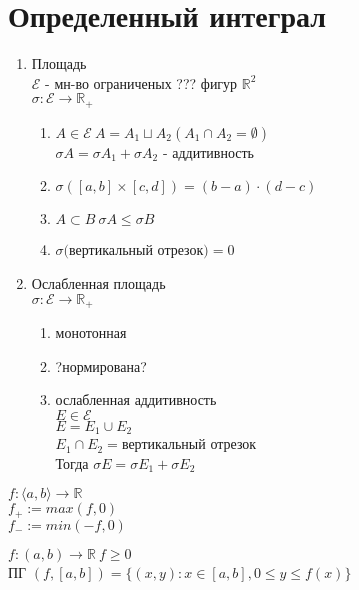\documentclass[12pt]{article}
\begin{document}
\section{Определенный интеграл}
\begin{enumerate}
\item Площадь \\
  $\mathcal{E}$ - мн-во ограниченых ??? фигур $\mathbb{R}^2$ \\
  $\sigma: \mathcal{E} \rightarrow \mathbb{R}_+$ \\
  \begin{enumerate}
  \item $A \in \mathcal{E}\ A = A_1 \sqcup A_2 (A_1 \cap A_2 = \emptyset)$\\
    $\sigma A = \sigma A_1 + \sigma A_2$ - аддитивность
  \item $\sigma([a, b] \times [c, d])=(b - a) \cdot (d - c)$
  \item
    \begin{note}
      $A \subset B\ \sigma A \le \sigma B$
    \end{note}
  \item
    \begin{note}
      $\sigma($вертикальный отрезок$) = 0$
    \end{note}
  \end{enumerate}
  \item Ослабленная площадь \\
    $\sigma: \mathcal{E} \rightarrow \mathbb{R}_+$
    \begin{enumerate}
    \item монотонная
    \item ?нормирована?
    \item ослабленная аддитивность \\
      $E \in \mathcal{E}$ \\
      $E = E_1 \cup E_2$ \\
      $E_1 \cap E_2 = $вертикальный отрезок \\
      Тогда $\sigma E = \sigma E_1 + \sigma E_2$
    \end{enumerate}
\end{enumerate}
\begin{definition}
  $f: \langle a, b \rangle \rightarrow \mathbb{R}$ \\
  $f_+ := max(f, 0)$ \\
  $f_- := min(-f, 0)$
\end{definition}
\begin{definition}
  $f: (a,b) \rightarrow \mathbb{R}\ f \ge 0$ \\
  ПГ $(f, [a, b]) = \{(x, y): x \in [a,b], 0 \le y \le f(x)\}$
\end{definition}
\end{document}

